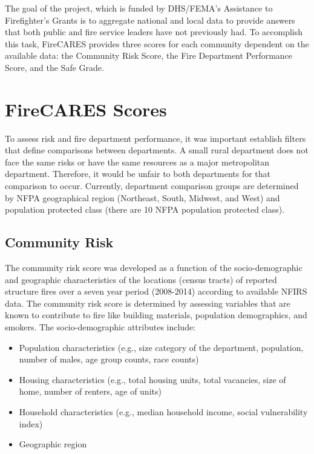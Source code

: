 \documentclass[12pt,oneside]{book}
\begin{document}
The goal of the project, which is funded by DHS/FEMA's Assistance to Firefighter's Grants is to aggregate national and local data to provide answers that both public and fire service leaders have not previously had. To accomplish this task, FireCARES provides three scores for each community dependent on the available data: the Community Risk Score, the Fire Department Performance Score, and the Safe Grade.

\chapter{FireCARES Scores}

To assess risk and fire department performance, it was important establish filters that define comparisons between departments. A small rural department does not face the same risks or have the same resources as a major metropolitan department. Therefore, it would be unfair to both departments for that comparison to occur. Currently, department comparison groups are determined by NFPA geographical region (Northeast, South, Midwest, and West) and population protected class (there are 10 NFPA population protected class).

\section{Community Risk}

The community risk score was developed as a function of the socio-demographic and geographic characteristics of the locations (census tracts) of reported structure fires over a seven year period (2008-2014) according to available NFIRS data. The community risk score is determined by assessing variables that are known to contribute to fire like building materials, population demographics, and smokers. The socio-demographic attributes include:

\begin{itemize}
\item Population characteristics (e.g., size category of the department, population, number of males, age group counts, race counts)
\item Housing characteristics (e.g., total housing units, total vacancies, size of home, number of renters, age of units)
\item Household characteristics (e.g., median household income, social vulnerability index)
\item Geographic region
\end{itemize}
\end{document}
